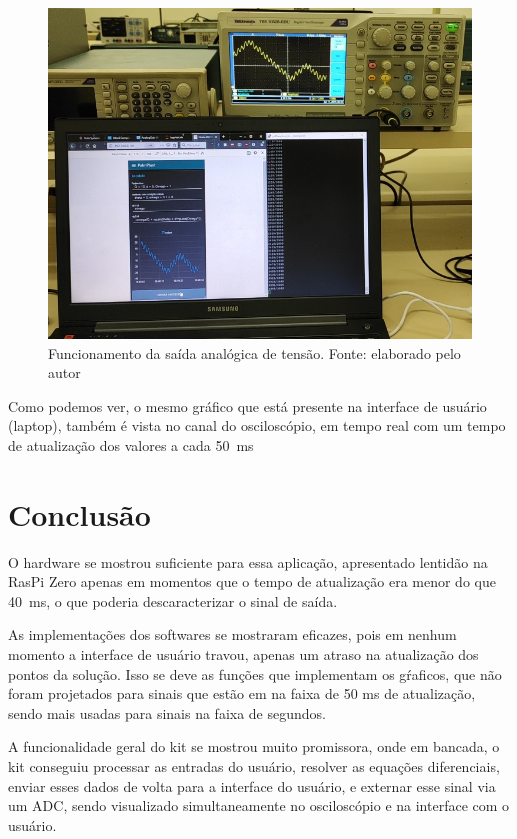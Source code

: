 \documentclass[journal]{IEEEtranTIE}
\begin{document}
\begin{figure}[!h]
	\includegraphics[width=\linewidth]{img/real_running.png}
    \caption{Funcionamento da saída analógica de tensão. Fonte: elaborado pelo autor}
    \label{fig:real}
\end{figure}

Como podemos ver, o mesmo gráfico que está presente na interface de usuário (laptop), também é vista no canal do osciloscópio, em tempo real com um tempo de atualização dos valores a cada \SI{50}{\milli\second}



\section{Conclusão}

O hardware se mostrou suficiente para essa aplicação, apresentado lentidão na RasPi Zero apenas em momentos que o tempo de atualização era menor do que \SI{40}{\milli\second}, o que poderia descaracterizar o sinal de saída.

As implementações dos softwares se mostraram eficazes, pois em nenhum momento a interface de usuário travou, apenas um atraso na atualização dos pontos da solução. Isso se deve as funções que implementam os gŕaficos, que não foram projetados para sinais que estão em na faixa de 50 ms de atualização, sendo mais usadas para sinais na faixa de segundos.

A funcionalidade geral do kit se mostrou muito promissora, onde em bancada, o kit conseguiu processar as entradas do usuário, resolver as equações diferenciais, enviar esses dados de volta para a interface do usuário, e externar esse sinal via um ADC, sendo visualizado simultaneamente no osciloscópio e na interface com o usuário.
\end{document}
